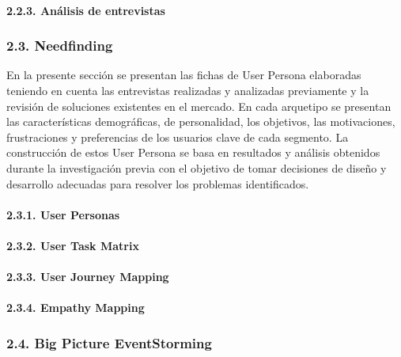 \paragraph{2.2.3. Análisis de
entrevistas}\label{report__20-cap2-requirements-analysis.md__anuxe1lisis-de-entrevistas}

\subsubsection{2.3.
Needfinding}\label{report__20-cap2-requirements-analysis.md__needfinding}

En la presente sección se presentan las fichas de User Persona
elaboradas teniendo en cuenta las entrevistas realizadas y analizadas
previamente y la revisión de soluciones existentes en el mercado. En
cada arquetipo se presentan las características demográficas, de
personalidad, los objetivos, las motivaciones, frustraciones y
preferencias de los usuarios clave de cada segmento. La construcción de
estos User Persona se basa en resultados y análisis obtenidos durante la
investigación previa con el objetivo de tomar decisiones de diseño y
desarrollo adecuadas para resolver los problemas identificados.

\paragraph{2.3.1. User
Personas}\label{report__20-cap2-requirements-analysis.md__user-personas}

\paragraph{2.3.2. User Task
Matrix}\label{report__20-cap2-requirements-analysis.md__user-task-matrix}

\paragraph{2.3.3. User Journey
Mapping}\label{report__20-cap2-requirements-analysis.md__user-journey-mapping}

\paragraph{2.3.4. Empathy
Mapping}\label{report__20-cap2-requirements-analysis.md__empathy-mapping}

\subsubsection{2.4. Big Picture
EventStorming}\label{report__20-cap2-requirements-analysis.md__big-picture-eventstorming}

